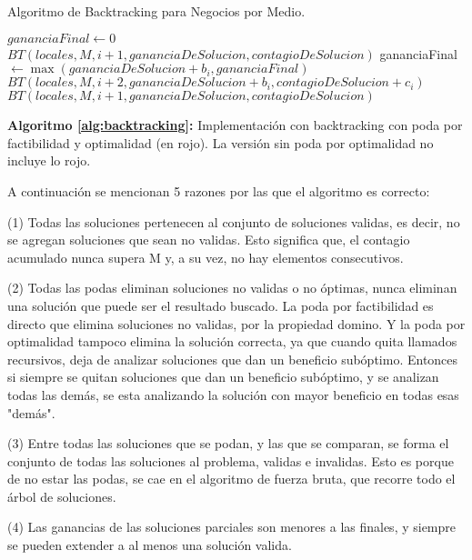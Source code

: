\documentclass[10pt,a4paper]{article}
\begin{document}
\begin{algorithm}
\caption{Algoritmo de Backtracking para Negocios por Medio.}
\begin{algorithmic}[1]
\State $gananciaFinal \gets 0$
            \State $BT(locales, M, i+1, gananciaDeSolucion, contagioDeSolucion)$
        \ElsIf{\textcolor{red}{$gananciaDeSolucion + s_i > gananciaFinal$}}
            \State gananciaFinal $\gets \max(gananciaDeSolucion + b_i, gananciaFinal)$
            \State $BT(locales, M, i+2, gananciaDeSolucion + b_i, contagioDeSolucion + c_i)$
            \State $BT(locales, M, i+1, gananciaDeSolucion, contagioDeSolucion)$
        \EndIf
    \EndIf
\EndFunction
\end{algorithmic}
\label{alg:backtracking}
\end{algorithm}
\textbf{Algoritmo \ref{alg:backtracking}:} Implementación con backtracking con poda por factibilidad y optimalidad (en rojo). La versión sin poda por optimalidad no incluye lo rojo. 

A continuación se mencionan 5 razones por las que el algoritmo es correcto:

(1) Todas las soluciones pertenecen al conjunto de soluciones validas, es decir, no se agregan soluciones que sean no validas. Esto significa que, el contagio acumulado nunca supera M y, a su vez, no hay elementos consecutivos. 

(2) Todas las podas eliminan soluciones no validas o no óptimas, nunca eliminan una solución que puede ser el resultado buscado. La poda por factibilidad es directo que elimina soluciones no validas, por la propiedad domino. Y la poda por optimalidad tampoco elimina la solución correcta, ya que cuando quita llamados recursivos, deja de analizar soluciones que dan un beneficio subóptimo. Entonces si siempre se quitan soluciones que dan un beneficio subóptimo, y se analizan todas las demás, se esta analizando la solución con mayor beneficio en todas esas "demás".

(3) Entre todas las soluciones que se podan, y las que se comparan, se forma el conjunto de todas las soluciones al problema, validas e invalidas. Esto es porque de no estar las podas, se cae en el algoritmo de fuerza bruta, que recorre todo el árbol de soluciones.

(4) Las ganancias de las soluciones parciales son menores a las finales, y siempre se pueden extender a al menos una solución valida.
\end{document}

